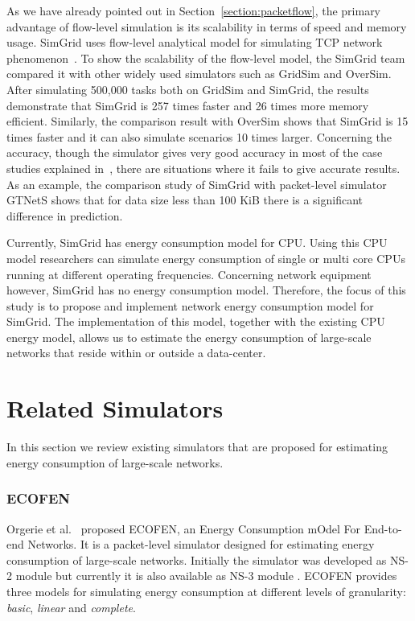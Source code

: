 As we have already pointed out in Section~\ref{section:packetflow}, the primary advantage of flow-level simulation is its scalability in terms of speed and memory usage. SimGrid uses flow-level analytical model for simulating TCP network phenomenon~\cite{DBLP:journals/jpdc/CasanovaGLQS14}. To show the scalability of the flow-level model, the SimGrid team compared it with other widely used simulators such as GridSim and OverSim. After simulating 500,000 tasks both on GridSim and SimGrid, the results demonstrate that SimGrid is 257 times faster and 26 times more memory efficient. Similarly, the comparison result with OverSim shows that SimGrid is 15 times faster and it can also simulate scenarios 10 times larger. Concerning the accuracy, though the simulator gives very good accuracy in most of the case studies explained in~\cite{DBLP:journals/jpdc/CasanovaGLQS14}, there are situations where it fails to give accurate results. As an example, the comparison study of SimGrid with packet-level simulator GTNetS shows that for data size less than 100 KiB there is a significant difference in prediction. 

Currently, SimGrid has energy consumption model for CPU. Using this CPU model researchers can simulate energy consumption of single or multi core CPUs running at different operating frequencies. Concerning network equipment however, SimGrid has no energy consumption model. Therefore, the focus of this study is to propose and implement network energy consumption model for SimGrid. The implementation of this model, together with the existing CPU energy model, allows us to estimate the energy consumption of large-scale networks that reside within or outside a data-center.

\section{Related Simulators}
\label{section:relatedsimulator} 
In this section we review existing simulators that are proposed for estimating energy consumption of large-scale networks. 
\subsubsection{ECOFEN}
\label{subsection:ecofen} 
Orgerie et al.~\cite{DBLP:conf/wowmom/OrgerieLLL11} proposed ECOFEN, an Energy Consumption
mOdel For End-to-end Networks. It is a packet-level simulator designed for estimating energy consumption of large-scale networks. Initially the simulator was developed as NS-2 module but currently it is also available as NS-3 module \cite{DBLP:conf/cloudnet/CorneaOL14}. ECOFEN provides three models for simulating energy consumption at different levels of granularity: \emph{basic}, \emph{linear} and \emph{complete}.

